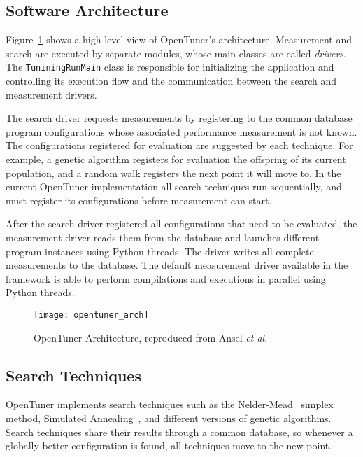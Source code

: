 \subsection{Software Architecture}
\label{sec:arch}

Figure~\ref{fig:ot-imp} shows a high-level view of OpenTuner's architecture.
Measurement and search are executed by separate modules, whose main classes are
called \emph{drivers}. The \texttt{TuniningRunMain} class is responsible for
initializing the application and controlling its execution flow and
the communication between the search and measurement drivers.

The search driver requests measurements by registering to the common database
program configurations whose associated performance measurement is not known.
The configurations registered for evaluation are suggested by each technique.
For example, a genetic algorithm registers for evaluation the offspring of its
current population, and a random walk registers the next point it will move to.
In the current OpenTuner implementation all search techniques run sequentially,
and must register its configurations before measurement can start.

After the search driver registered all configurations that need to be
evaluated, the measurement driver reads them from the database and launches
different program instances using Python threads. The driver writes all
complete measurements to the database. The default measurement driver available
in the framework is able to perform compilations and executions in parallel
using Python threads.

\begin{figure}[htpb]
    \centering
    \texttt{[image: opentuner\_arch]}
    \caption{OpenTuner Architecture, reproduced from Ansel \emph{et
    al.}~\cite{ansel2014opentuner}}
    \label{fig:ot-imp}
\end{figure}

\subsection{Search Techniques}
\label{sec:techniques}

OpenTuner implements search techniques such as the
Nelder-Mead~\cite{nelder1965simplex} simplex method, Simulated
Annealing~\cite{kirkpatrick1983optimization}, and different versions of genetic
algorithms. Search techniques share their results through a common database,
so whenever a globally better configuration is found, all techniques move
to the new point.

